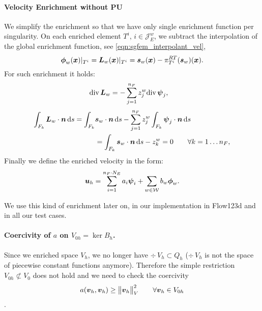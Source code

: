 \paragraph{Velocity Enrichment without PU}
We simplify the enrichment so that we have only single enrichment function per singularity.
On each enriched element $T^i,\, i\in\mathcal{J}^w_E$, we subtract the interpolation
of the global enrichment function, see \eqref{eqn:sgfem_interpolant_vel},
\begin{equation}
    \mathbf{\boldsymbol{\phi}}_w(\mathbf{\boldsymbol{x}})|_{T^i} = \mathbf{\boldsymbol{L}}_{w}(\mathbf{\boldsymbol{x}})|_{T^i} = \mathbf{\boldsymbol{s}}_w(\mathbf{\boldsymbol{x}}) - \pi^{RT}_{T^i}(\mathbf{\boldsymbol{s}}_w)(\mathbf{\boldsymbol{x}}).
    \label{eqn:local_enr_vel}
\end{equation}
%
For such enrichment it holds:   
\begin{align}
    {\rm div}\,\mathbf{\boldsymbol{L}}_w &= - \sum \limits_{j=1}^{n_F} z^w_j {\rm div}\,\mathbf{\boldsymbol{\psi}}_j,
    \label{eqn:local_enr_vel_div_single}
\end{align}
\begin{align}
    \int_{F_k} \mathbf{\boldsymbol{L}}_w\cdot\mathbf{\boldsymbol{n}} \,{\rm d} s = \int_{F_k} &\mathbf{\boldsymbol{s}}_w\cdot\mathbf{\boldsymbol{n}} \,{\rm d} s
        - \sum \limits_{j=1}^{n_F} z^w_j \int_{F_k} \mathbf{\boldsymbol{\psi}}_j \cdot \mathbf{\boldsymbol{n}} \,{\rm d} s \nonumber\\
    &= \int_{F_k} \mathbf{\boldsymbol{s}}_w\cdot\mathbf{\boldsymbol{n}} \,{\rm d} s - z^w_k = 0 \qquad \forall k=1\ldots n_F
    \label{eqn:local_enr_vel_normal},
\end{align}
%
Finally we define the enriched velocity in the form:
\begin{equation}
    \mathbf{\boldsymbol{u}}_h = 
    \sum \limits_{i=1}^{n_F\cdot N_E} a_i \mathbf{\boldsymbol{\psi}}_i + 
    \sum \limits_{w\in\mathcal{W}} b_w \mathbf{\boldsymbol{\phi}}_w.
    \label{eqn:velocity_enriched_approximation}
\end{equation}

We use this kind of enrichment later on, in our implementation in Flow123d and in all our test cases.

\paragraph{Coercivity of $a$ on $V_{0h}=\ker B_h$.}
Since we enriched space $V_h$, we no longer have $\div\,V_{h}\subset Q_h$
($\div\,V_{h}$ is not the space of piecewise constant functions anymore).
Therefore the simple restriction $V_{0h}\not\subset V_0$ does not hold and 
we need to check the coercivity
\[a(\mathbf{\boldsymbol{v}}_h,\mathbf{\boldsymbol{v}}_h)\geq \bigl\Vert\mathbf{\boldsymbol{v}}_h\bigr\Vert^2_V  \qquad \forall \mathbf{\boldsymbol{v}}_h\in V_{0h}\].

